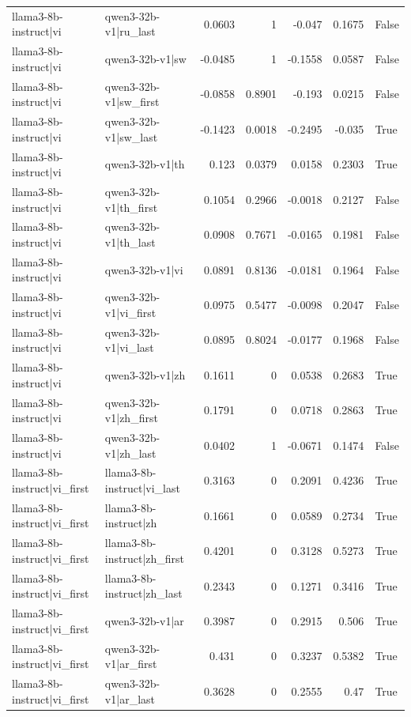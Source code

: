 \begin{table}
\begin{tabular}{l l r r r r l}
llama3-8b-instruct|vi & qwen3-32b-v1|ru_last & 0.0603 & 1 & -0.047 & 0.1675 & False \\
llama3-8b-instruct|vi & qwen3-32b-v1|sw & -0.0485 & 1 & -0.1558 & 0.0587 & False \\
llama3-8b-instruct|vi & qwen3-32b-v1|sw_first & -0.0858 & 0.8901 & -0.193 & 0.0215 & False \\
llama3-8b-instruct|vi & qwen3-32b-v1|sw_last & -0.1423 & 0.0018 & -0.2495 & -0.035 & True \\
llama3-8b-instruct|vi & qwen3-32b-v1|th & 0.123 & 0.0379 & 0.0158 & 0.2303 & True \\
llama3-8b-instruct|vi & qwen3-32b-v1|th_first & 0.1054 & 0.2966 & -0.0018 & 0.2127 & False \\
llama3-8b-instruct|vi & qwen3-32b-v1|th_last & 0.0908 & 0.7671 & -0.0165 & 0.1981 & False \\
llama3-8b-instruct|vi & qwen3-32b-v1|vi & 0.0891 & 0.8136 & -0.0181 & 0.1964 & False \\
llama3-8b-instruct|vi & qwen3-32b-v1|vi_first & 0.0975 & 0.5477 & -0.0098 & 0.2047 & False \\
llama3-8b-instruct|vi & qwen3-32b-v1|vi_last & 0.0895 & 0.8024 & -0.0177 & 0.1968 & False \\
llama3-8b-instruct|vi & qwen3-32b-v1|zh & 0.1611 & 0 & 0.0538 & 0.2683 & True \\
llama3-8b-instruct|vi & qwen3-32b-v1|zh_first & 0.1791 & 0 & 0.0718 & 0.2863 & True \\
llama3-8b-instruct|vi & qwen3-32b-v1|zh_last & 0.0402 & 1 & -0.0671 & 0.1474 & False \\
llama3-8b-instruct|vi_first & llama3-8b-instruct|vi_last & 0.3163 & 0 & 0.2091 & 0.4236 & True \\
llama3-8b-instruct|vi_first & llama3-8b-instruct|zh & 0.1661 & 0 & 0.0589 & 0.2734 & True \\
llama3-8b-instruct|vi_first & llama3-8b-instruct|zh_first & 0.4201 & 0 & 0.3128 & 0.5273 & True \\
llama3-8b-instruct|vi_first & llama3-8b-instruct|zh_last & 0.2343 & 0 & 0.1271 & 0.3416 & True \\
llama3-8b-instruct|vi_first & qwen3-32b-v1|ar & 0.3987 & 0 & 0.2915 & 0.506 & True \\
llama3-8b-instruct|vi_first & qwen3-32b-v1|ar_first & 0.431 & 0 & 0.3237 & 0.5382 & True \\
llama3-8b-instruct|vi_first & qwen3-32b-v1|ar_last & 0.3628 & 0 & 0.2555 & 0.47 & True \\

\end{tabular}
\end{table}
